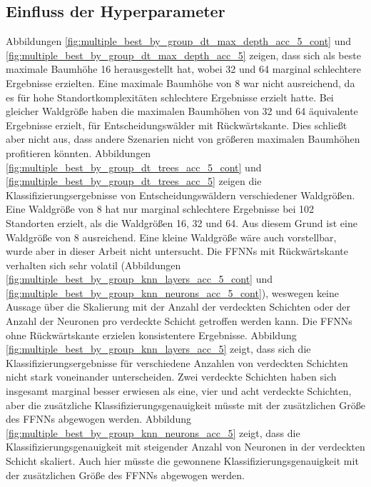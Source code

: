 \subsection{Einfluss der Hyperparameter}
Abbildungen \ref{fig:multiple_best_by_group_dt_max_depth_acc_5_cont} und \ref{fig:multiple_best_by_group_dt_max_depth_acc_5} zeigen, dass sich
als beste maximale Baumhöhe 16 herausgestellt hat, wobei 32 und 64 marginal schlechtere Ergebnisse erzielten.
Eine maximale Baumhöhe von 8 war nicht ausreichend, da es für hohe Standortkomplexitäten schlechtere Ergebnisse erzielt hatte.
Bei gleicher Waldgröße haben die maximalen Baumhöhen von 32 und 64 äquivalente Ergebnisse erzielt, für Entscheidungswälder mit Rückwärtskante.
\newline
\newline
Dies schließt aber nicht aus, dass andere Szenarien nicht von größeren maximalen Baumhöhen profitieren könnten.
Abbildungen \ref{fig:multiple_best_by_group_dt_trees_acc_5_cont} und \ref{fig:multiple_best_by_group_dt_trees_acc_5} zeigen
die Klassifizierungsergebnisse von Entscheidungswäldern verschiedener Waldgrößen.
Eine Waldgröße von 8 hat nur marginal schlechtere Ergebnisse bei 102 Standorten erzielt, als die Waldgrößen 16, 32 und 64.
Aus diesem Grund ist eine Waldgröße von 8 ausreichend. Eine kleine Waldgröße wäre auch vorstellbar, wurde aber in dieser Arbeit nicht untersucht.
\newline
\newline
Die FFNNs mit Rückwärtskante verhalten sich sehr volatil (Abbildungen \ref{fig:multiple_best_by_group_knn_layers_acc_5_cont}
und \ref{fig:multiple_best_by_group_knn_neurons_acc_5_cont}), weswegen keine Aussage über die Skalierung mit der
Anzahl der verdeckten Schichten oder der Anzahl der Neuronen pro verdeckte Schicht getroffen werden kann.
Die FFNNs ohne Rückwärtskante erzielen konsistentere Ergebnisse.
Abbildung \ref{fig:multiple_best_by_group_knn_layers_acc_5} zeigt, dass sich die Klassifizierungsergebnisse
für verschiedene Anzahlen von verdeckten Schichten nicht stark voneinander unterscheiden.
Zwei verdeckte Schichten haben sich insgesamt marginal besser erwiesen als eine, vier und acht verdeckte Schichten,
aber die zusätzliche Klassifizierungsgenauigkeit müsste mit der zusätzlichen Größe des FFNNs abgewogen werden.
Abbildung \ref{fig:multiple_best_by_group_knn_neurons_acc_5} zeigt, dass die Klassifizierungsgenauigkeit
mit steigender Anzahl von Neuronen in der verdeckten Schicht skaliert.
Auch hier müsste die gewonnene Klassifizierungsgenauigkeit mit der zusätzlichen Größe des FFNNs abgewogen werden.

